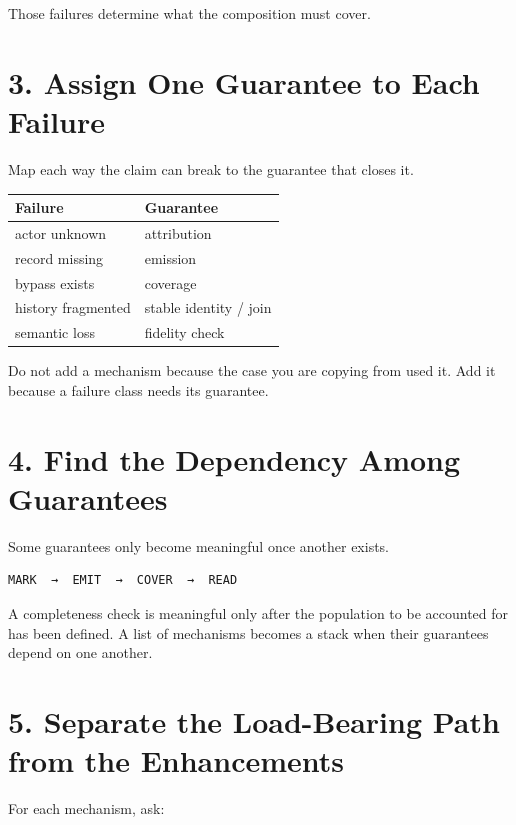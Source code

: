 Those failures determine what the composition must cover.

\section{3. Assign One Guarantee to Each Failure}\label{heading:assign-one-guarantee-to-each-failure}

Map each way the claim can break to the guarantee that closes it.

{\footnotesize
{\def\LTcaptype{none} %
\begin{longtable}[]{@{}ll@{}}
\toprule\noalign{}
Failure & Guarantee \\
\midrule\noalign{}
\endhead
\bottomrule\noalign{}
\endlastfoot
actor unknown & attribution \\
record missing & emission \\
bypass exists & coverage \\
history fragmented & stable identity / join \\
semantic loss & fidelity check \\
\end{longtable}
}
}

Do not add a mechanism because the case you are copying from used it. Add it because a failure class needs its guarantee.

\section{4. Find the Dependency Among Guarantees}\label{heading:find-the-dependency-among-guarantees}

Some guarantees only become meaningful once another exists.

\begin{verbatim}
MARK  →  EMIT  →  COVER  →  READ
\end{verbatim}

A completeness check is meaningful only after the population to be accounted for has been defined. A list of mechanisms becomes a stack when their guarantees depend on one another.

\section{5. Separate the Load-Bearing Path from the Enhancements}\label{heading:separate-the-load-bearing-path-from-the-enhancements}

For each mechanism, ask:

